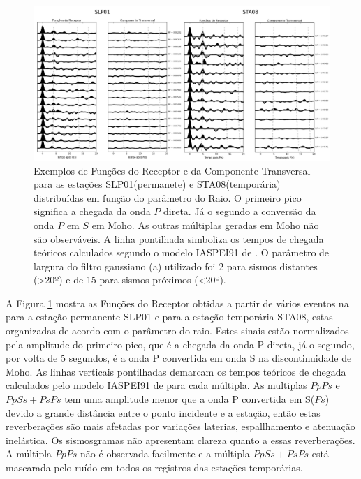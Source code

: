 \begin{figure}[!ht]
\centering
\includegraphics[scale=0.16]{Figs/RF_SLP01_STA08.png}
\caption[Exemplos de Funções do Receptor e da Componente Transversal para as estações SLP01(permanete) e STA08(temporária) distribuídas em função do parâmetro do Raio.]{Exemplos de Funções do Receptor e da Componente Transversal para as estações SLP01(permanete) e STA08(temporária) distribuídas em função do parâmetro do Raio. O primeiro pico significa a chegada da onda $P$ direta. Já o segundo a conversão da onda $P$ em $S$ em Moho. As outras múltiplas geradas em Moho não são observáveis. A linha pontilhada simboliza os tempos de chegada teóricos calculados segundo o modelo IASPEI91 de \cite{kennet_iaspei_1991}. O parâmetro de largura do filtro gaussiano (a) utilizado foi 2 para sismos distantes (>20º) e de 15 para sismos próximos (<20º). }
\label{RF_SLP01_STA08}
\end{figure}

A Figura \ref{RF_SLP01_STA08} mostra as Funções do Receptor obtidas a partir de vários eventos na para a estação permanente SLP01 e para a estação temporária STA08, estas organizadas de acordo com o parâmetro do raio. Estes sinais estão normalizados pela amplitude do primeiro pico, que é a chegada da onda P direta, já o segundo, por volta de 5 segundos, é a onda P convertida em onda S na discontinuidade de Moho. As linhas verticais pontilhadas demarcam os tempos teóricos de chegada calculados pelo modelo IASPEI91 de \cite{kennet_iaspei_1991} para cada múltipla. As multiplas $PpPs$ e $PpSs+PsPs$ tem uma amplitude menor que a onda P convertida em S($Ps$) devido a grande distância entre o ponto incidente e a estação, então estas reverberações são mais afetadas por variações laterias, espallhamento e atenuação inelástica. Os sismosgramas não apresentam clareza quanto a essas reverberações. A múltipla $PpPs$ não é observada facilmente e a múltipla $PpSs+PsPs$ está mascarada pelo ruído em todos os registros das estações temporárias.


